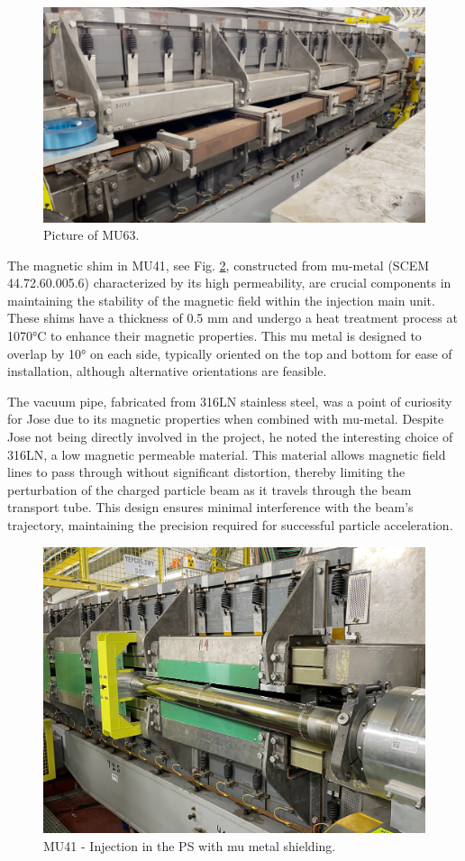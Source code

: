 \begin{figure}[h]
    \centering
    \includegraphics[width=1.0\textwidth]{Appendix/images/mu63_shim3.png}
    \caption{Picture of MU63.}
    \label{fig:mu63_shim3}
\end{figure}

The magnetic shim in MU41, see Fig. \ref{fig:mu41_shim}, constructed from mu-metal (SCEM 44.72.60.005.6) characterized by its high permeability, are crucial components in maintaining the stability of the magnetic field within the injection main unit. These shims have a thickness of 0.5 mm and undergo a heat treatment process at 1070°C to enhance their magnetic properties. This mu metal is designed to overlap by 10° on each side, typically oriented on the top and bottom for ease of installation, although alternative orientations are feasible.

The vacuum pipe, fabricated from 316LN stainless steel, was a point of curiosity for Jose due to its magnetic properties when combined with mu-metal. Despite Jose not being directly involved in the project, he noted the interesting choice of 316LN, a low magnetic permeable material. This material allows magnetic field lines to pass through without significant distortion, thereby limiting the perturbation of the charged particle beam as it travels through the beam transport tube. This design ensures minimal interference with the beam's trajectory, maintaining the precision required for successful particle acceleration.


\begin{figure}[h]
    \centering
    \includegraphics[width=1.0\textwidth]{Appendix/images/mu41_shim.png}
    \caption{MU41 - Injection in the PS with mu metal shielding.}
    \label{fig:mu41_shim}
\end{figure}